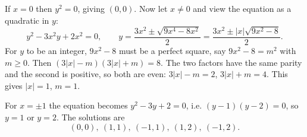 If $x=0$ then $y^2=0$, giving $(0,0)$. Now let $x\ne0$ and view the equation as a quadratic in $y$:
\[
y^2-3x^2y+2x^2=0,\qquad y=\dfrac{3x^2\pm\sqrt{9x^4-8x^2}}{2}=\dfrac{3x^2\pm|x|\sqrt{9x^2-8}}{2}.
\]
For $y$ to be an integer, $9x^2-8$ must be a perfect square, say $9x^2-8=m^2$ with $m\ge0$. Then $(3|x|-m)(3|x|+m)=8$. The two factors have the same parity and the second is positive, so both are even: $3|x|-m=2$, $3|x|+m=4$. This gives $|x|=1$, $m=1$.

For $x=\pm1$ the equation becomes $y^2-3y+2=0$, i.e. $(y-1)(y-2)=0$, so $y=1$ or $y=2$. The solutions are
\[
\boxed{(0,0),\ (1,1),\ (-1,1),\ (1,2),\ (-1,2)}.
\]
